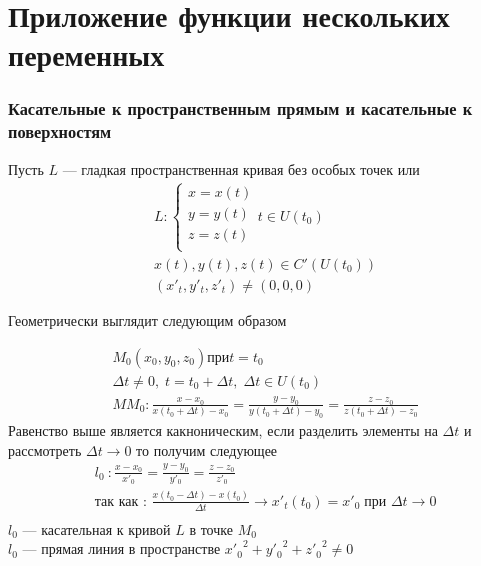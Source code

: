 \author{Andrei Tkachuk}
\part{Приложение функции нескольких переменных}
\section{Касательные к пространственным прямым и касательные к поверхностям}
		\begin{Def}
			Пусть $L$ --- гладкая пространственная кривая без особых точек или
			\begin{align*}
				&L : 
				\begin{cases}
					x = x(t) \\
					y = y(t) \\
					z = z(t) \\
				\end{cases} t \in U(t_0) \\ 
				&x(t), y(t), z(t) \in C'(U(t_0)) \\ 
				&(x'_t, y'_t, z'_t) \neq (0, 0, 0) 
			\end{align*}
		\end{Def}   
        Геометрически выглядит следующим образом
        \begin{figure}[bh]
            \noindent{}
        \end{figure}
		\begin{align*}
			&M_0(x_0, y_0, z_0) при t = t_0\\
			&\Delta t \neq 0, \; t = t_0 + \Delta t, \; \Delta t \in  U(t_0)\\
			&MM_0 : \frac{x - x_0}{x (t_0 + \Delta t) - x_0} = \frac{y - y_0}{y (t_0 + \Delta t) - y_0} = \frac{z - z_0}{z (t_0 + \Delta t) - z_0}
		\end{align*}
		Равенство выше является какноническим, если разделить элементы на $\Delta t$ и рассмотреть $\Delta t \rightarrow 0$ то получим следующее
		\begin{align*}
			&l_0 \: : \frac{x - x_0}{x'_0} = \frac{y - y_0}{y'_0} = \frac{z - z_0}{z'_0}\\
			&\text{так как : }\frac{x(t_0 - \Delta t) - x(t_0)}{\Delta t} \to x'_t(t_0) = x'_0 \; \text{при } \Delta t \to 0 \\
		\end{align*}
		$l_0$ --- касательная к кривой $L$ в точке $M_0$ \\
		$l_0$ --- прямая линия в пространстве ${x'_0}^2 + {y'_0}^2 + {z'_0}^2 \neq 0$
		
